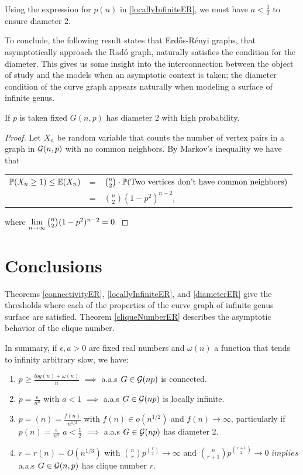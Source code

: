 Using the expression for $p(n)$ in \ref{locallyInfiniteER}, we must have $a<\frac{1}{2}$ to ensure diameter 2.

To conclude, the following result states that Erdős-Rényi graphs, that asymptotically approach the Radó graph, naturally satisfies the condition for the diameter. This gives us some insight into the interconnection between the object of study and the models when an asymptotic context is taken; the diameter condition of the curve graph appears naturally when modeling a surface of infinite genus.

\begin{theorem}
If $p$ is taken fixed $G(n,p)$ has diameter 2 with high probability.
\end{theorem}

\begin{proof}
Let $X_{n}$ be random variable that counts the number of vertex pairs in a graph in $\G(n,p)$ with no common neighbors. By Markov's inequality we have that
\begin{center}
\begin{tabular}{ r c l }
 $\P(X_{n} \geq 1)\leq \E(X_{n})$ & = & $\binom{n}{2} \cdot \P(\text{Two vertices don't have common neighbors})$ \\
 & = & $\binom{n}{2} (1-p^{2})^{n-2}$,
\end{tabular}
\end{center}
where $\lim\limits_{n \to \infty}\binom{n}{2} (1-p^{2})^{n-2} = 0. \qedhere$
\end{proof}

\section{Conclusions}

Theorems \ref{connectivityER}, \ref{locallyInfiniteER}, and \ref{diameterER} give the thresholds where each of the properties of the curve graph of infinite genus surface are satisfied. Theorem \ref{cliqueNumberER} describes the asymptotic behavior of the clique number.

In summary, if $\epsilon, a > 0$ are fixed real numbers and $\omega(n)$ a function that tends to infinity arbitrary slow, we have:
\begin{enumerate}
    \item $p\geq \frac{log(n)+ \omega(n)}{n}$ $\implies$ a.a.s $G\in\G(np)$ is connected.
    \item $p=\frac{\epsilon}{n^{a}}$ with $a<1$ $\implies$ a.a.s $G\in\G(np)$ is locally infinite.
    \item $p=(n) = \frac{f(n)}{n^{1/2}}$ with $f(n)\in o(n^{1/2})$ and $f(n)\to \infty$, particularly if $p(n)=\frac{\epsilon}{n^{a}}$ $a<\frac{1}{2}$ $\implies$ a.a.s  $G\in\G(np)$ has diameter 2.
    \item $r = r(n) = O(n^{1/3})$ with $\binom{n}{r} p^{\binom{r}{2}} \to \infty \text{ and } \binom{n}{r+1} p^{\binom{r+1}{2}} \to 0 $ $implies$ a.a.s $G\in\G(n,p)$ has clique number $r$.
\end{enumerate}

